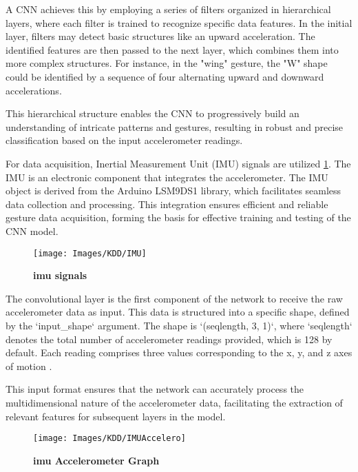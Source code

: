 A CNN achieves this by employing a series of filters organized in hierarchical layers, where each filter is trained to recognize specific data features. In the initial layer, filters may detect basic structures like an upward acceleration. The identified features are then passed to the next layer, which combines them into more complex structures. For instance, in the "wing" gesture, the "W" shape could be identified by a sequence of four alternating upward and downward accelerations.  

This hierarchical structure enables the CNN to progressively build an understanding of intricate patterns and gestures, resulting in robust and precise classification based on the input accelerometer readings.  

For data acquisition, Inertial Measurement Unit (IMU) signals are utilized \ref{fig:IMU}. The IMU is an electronic component that integrates the accelerometer. The IMU object is derived from the Arduino LSM9DS1 library, which facilitates seamless data collection and processing. This integration ensures efficient and reliable gesture data acquisition, forming the basis for effective training and testing of the CNN model.  

\begin{figure}[h!]
	\begin{center}
		\texttt{[image: Images/KDD/IMU]}
		\caption{\textbf{\ac{imu} signals \cite{Xu:2022} }}
		\label{fig:IMU}
	\end{center}
\end{figure}

The convolutional layer is the first component of the network to receive the raw accelerometer data as input. This data is structured into a specific shape, defined by the `input\_shape` argument. The shape is `(seqlength, 3, 1)`, where `seqlength` denotes the total number of accelerometer readings provided, which is 128 by default. Each reading comprises three values corresponding to the x, y, and z axes of motion \cite{Xu:2022}. 

This input format ensures that the network can accurately process the multidimensional nature of the accelerometer data, facilitating the extraction of relevant features for subsequent layers in the model.

\begin{figure}[H]
	\begin{center}
		
		\texttt{[image: Images/KDD/IMUAccelero]}
		\caption{\textbf{\ac{imu} Accelerometer Graph}}
		\label{fig:Accel}
		
	\end{center}
\end{figure}

